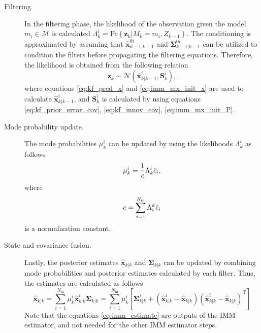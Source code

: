 \documentclass[english, 12pt, a4paper, elec, utf8, a-1b, online]{aaltothesis}
\renewcommand{\vec}[1]{\mathbf{#1}}
\renewcommand{\Pr}[1]{\text{Pr}\left\{ #1 \right\}}
\newcommand{\xpost}{\hat{\vec{x}}_{k|k}}
\newcommand{\postecov}{\boldsymbol{\Sigma}_{k|k}}
\newcommand{\z}{\vec{z}_k}
\newcommand{\normal}[2]{\mathcal{N}\left(#1, #2 \right)}
\newcommand{\transpose}[1]{#1^\text{T}}
\newcommand{\mxnorm}{ \Bar{c}_i }
\newcommand{\xmxinit}{\hat{\vec{x}}^{0i}_{k-1|k-1}}
\newcommand{\ecovmxinit}{\bm{\Sigma}^{0i}_{k-1|k-1}}
\newcommand{\modexprior}{\hat{\vec{x}}^{i}_{k|k-1}}
\newcommand{\modeinnovcov}{\mathbf{S}^i_{k}}
\newcommand{\modexpost}{\hat{\vec{x}}^{i}_{k|k}}
\newcommand{\modecovpost}{\bm{\Sigma}^i_{k|k}}
\newcommand{\modeobsprob}{\Lambda^i_k}
\newcommand{\nmodels}{{N_\text{m}}}
\begin{document}
\begin{description}
\item[Filtering.]

In the filtering phase, the likelihood of the observation given the model $m_i \in \mathcal{M}$ is calculated  $\modeobsprob = \Pr{\z | M_k = m_i, Z_{k-1}} $.
The conditioning is approximated by assuming that $\xmxinit$ and $\ecovmxinit$ can be utilized to condition the filters before propagating the filtering equations.
Therefore, the likelihood is obtained from the following relation
\begin{equation}
    \z \sim \normal{\modexprior}{\modeinnovcov},
\end{equation}
where equations \eqref{eq:kf_pred_x} and \eqref{eq:imm_mx_init_x} are used to calculate $\modexprior$, and $\modeinnovcov$ is calculated by using equations \eqref{eq:kf_prior_error_cov}, \eqref{eq:kf_innov_cov}, \eqref{eq:imm_mx_init_P}.

\item[Mode probability update.]

The mode probabilities $\mu^i_k$ can be updated by using the likelihoods $\Lambda_k^i$ as follows
\begin{equation}
    \mu_k^i = \frac{1}{c} \Lambda^i_k \mxnorm,
\end{equation}
where
\begin{equation}
    c = \sum_{i=1}^\nmodels \Lambda_i^k \mxnorm
\end{equation}
is a normalization constant.

\item[State and covariance fusion.]
Lastly, the posterior estimates $\xpost$ and $\postecov$ can be updated by combining mode probabilities and posterior estimates calculated by each filter.
Thus, the estimates are calculated as follows
\begin{subequations}
\label{eq:imm_estimate}
\begin{equation}\label{eq:imm_fusion_x}
    \xpost = \sum_{i=1}^\nmodels \mu_k^i \modexpost
\end{equation}
\begin{equation}\label{eq:imm_fusion_P}
    \postecov = \sum_{i=1}^\nmodels \mu_k^i 
    \left[ 
        \modecovpost + \left( \modexpost - \xpost \right) \transpose{\left( \modexpost - \xpost \right)}
    \right]
\end{equation}
\end{subequations}
Note that the equations \eqref{eq:imm_estimate} are outputs of the IMM estimator, and not needed for the other IMM estimator steps.
\end{description}
\end{document}
